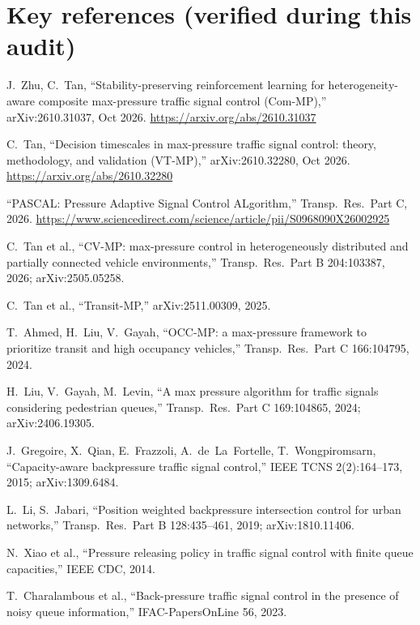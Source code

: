 \documentclass[11pt,a4paper]{article}
\begin{document}
\section{Key references (verified during this audit)}
\small
\begin{enumerate}[label={[\arabic*]},leftmargin=*]
\item J.~Zhu, C.~Tan, ``Stability-preserving reinforcement learning for heterogeneity-aware
  composite max-pressure traffic signal control (Com-MP),'' arXiv:2610.31037, Oct 2026.
  \url{https://arxiv.org/abs/2610.31037}
\item C.~Tan, ``Decision timescales in max-pressure traffic signal control: theory,
  methodology, and validation (VT-MP),'' arXiv:2610.32280, Oct 2026.
  \url{https://arxiv.org/abs/2610.32280}
\item ``PASCAL: Pressure Adaptive Signal Control ALgorithm,'' Transp.\ Res.\ Part C, 2026.
  \url{https://www.sciencedirect.com/science/article/pii/S0968090X26002925}
\item C.~Tan et al., ``CV-MP: max-pressure control in heterogeneously distributed and
  partially connected vehicle environments,'' Transp.\ Res.\ Part B 204:103387, 2026;
  arXiv:2505.05258.
\item C.~Tan et al., ``Transit-MP,'' arXiv:2511.00309, 2025.
\item T.~Ahmed, H.~Liu, V.~Gayah, ``OCC-MP: a max-pressure framework to prioritize transit
  and high occupancy vehicles,'' Transp.\ Res.\ Part C 166:104795, 2024.
\item H.~Liu, V.~Gayah, M.~Levin, ``A max pressure algorithm for traffic signals considering
  pedestrian queues,'' Transp.\ Res.\ Part C 169:104865, 2024; arXiv:2406.19305.
\item J.~Gregoire, X.~Qian, E.~Frazzoli, A.~de~La~Fortelle, T.~Wongpiromsarn,
  ``Capacity-aware backpressure traffic signal control,'' IEEE TCNS 2(2):164--173, 2015;
  arXiv:1309.6484.
\item L.~Li, S.~Jabari, ``Position weighted backpressure intersection control for urban
  networks,'' Transp.\ Res.\ Part B 128:435--461, 2019; arXiv:1810.11406.
\item N.~Xiao et al., ``Pressure releasing policy in traffic signal control with finite
  queue capacities,'' IEEE CDC, 2014.
\item T.~Charalambous et al., ``Back-pressure traffic signal control in the presence of
  noisy queue information,'' IFAC-PapersOnLine 56, 2023.

\end{enumerate}
\end{document}
